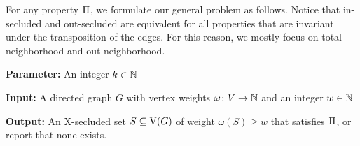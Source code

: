 For any property $\propOp$, we formulate our general problem as follows. Notice that in-secluded and out-secluded are equivalent for all properties that are invariant under the transposition of the edges. For this reason, we mostly focus on total-neighborhood and out-neighborhood.
\begin{tcolorbox}[enhanced,title={\color{black} {\textsc{X-Secluded $\propOp$-Subgraph} \quad ($\text{X} \in \set{\text{In}, \text{Out}, \text{Total}}$)}}, colback=white, boxrule=0.4pt,
	attach boxed title to top left={xshift=.3cm, yshift*=-2.5mm},
	boxed title style={size=small,frame hidden,colback=white}]
	\textbf{Parameter:} An integer $k \in \mathbb{N}$ 

	\textbf{Input:}  A directed graph $G$ with vertex weights $\omega \colon V \to \mathbb{N}$ and an integer $w \in \mathbb{N}$

	\textbf{Output:} An X-secluded set $S \subseteq \operatorname{V}({G})$ of weight $\omega(S) \ge w$ that satisfies $\propOp$, or report that none exists. 
\end{tcolorbox} 

